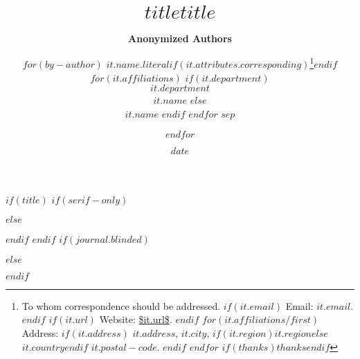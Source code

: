 $if(title)$
$if(serif-only)$
\title{\bfseries\huge $title$}
$else$
\title{\sffamily\bfseries\huge $title$}
$endif$
$endif$
$if(journal.blinded)$
\author{\textbf{Anonymized Authors}}
$else$
\author{$for(by-author)$
\textbf{$it.name.literal$}$if(it.attributes.corresponding)$\footnote{
To whom correspondence should be addressed.
$if(it.email)$
Email: \texttt{\href{mailto:$it.email$}{$it.email$}}.
$endif$
$if(it.url)$
Website: \url{$it.url$}.
$endif$
$for(it.affiliations/first)$
Address:
$if(it.address)$
$it.address$, $it.city$, $if(it.region)$$it.region$$else$$it.country$$endif$ $it.postal-code$.
$endif$
$endfor$
$if(thanks)$$thanks$$endif$}$endif$
$for(it.affiliations)$
$if(it.department)$
\\$it.department$\\$it.name$
$else$
\\$it.name$
$endif$
\vspace{0.05in}
$endfor$ $sep$
\and $endfor$}
$endif$
\date{$date$}